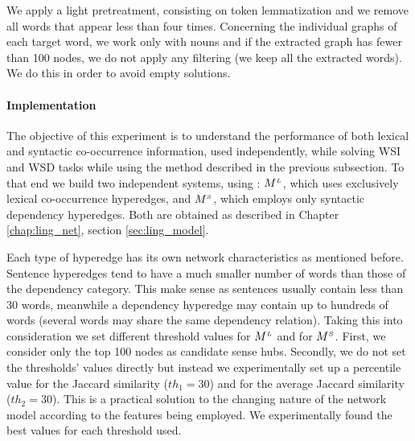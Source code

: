 We apply a light pretreatment, consisting on token lemmatization and we remove all words that appear less than four times. Concerning the individual graphs of each target word, we work only with nouns and if the extracted graph has fewer than 100 nodes, we do not apply any filtering (we keep all the extracted words). We do this in order to avoid empty solutions.



\paragraph{Implementation}
The objective of this experiment is to understand the performance of both lexical and syntactic co-occurrence information, used independently, while solving WSI and WSD tasks while using the method described in the previous subsection. To that end we build two independent systems, using : $M^{\scriptscriptstyle L}$, which uses exclusively lexical co-occurrence hyperedges, and $M^{\scriptscriptstyle S}$, which employs only syntactic dependency hyperedges. Both are obtained as described in Chapter \ref{chap:ling_net}, section \ref{sec:ling_model}.
 
Each type of hyperedge has its own network characteristics as mentioned before. Sentence hyperedges tend to have a much smaller number of words than those of the dependency category. This make sense as sentences usually contain less than 30 words, meanwhile a dependency hyperedge may contain up to hundreds of words (several words may share the same dependency relation). Taking this into consideration we set different threshold values for $M^{\scriptscriptstyle L}$ and for $M^{\scriptscriptstyle S}$. First, we  consider only the top 100 nodes as candidate sense hubs. Secondly, we do not set the thresholds' values directly but instead we experimentally set up a percentile value for the Jaccard similarity ($th_1=30$) and for the average Jaccard similarity ($th_2=30$). This is a practical solution to the changing nature of the network model according to the features being employed. We experimentally found the best values for  each threshold used.



